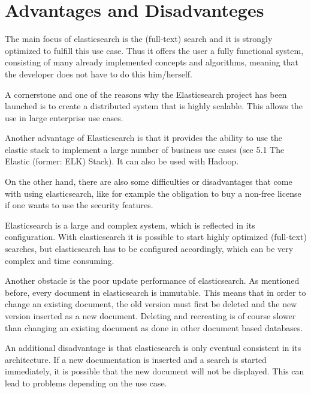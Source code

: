 \chapter{Advantages and Disadvanteges}

The main focus of elasticsearch is the (full-text) search and it is strongly optimized to fulfill this use case. Thus it offers the user a fully functional system, consisting of many already implemented concepts and algorithms, meaning that the developer does not have to do this him/herself.

A cornerstone and one of the reasons why the Elasticsearch project has been launched is to create a distributed system that is highly scalable. This allows the use in large enterprise use cases.

Another advantage of Elasticsearch is that it provides the ability to use the elastic stack to implement a large number of business use cases (see 5.1 The Elastic (former: ELK) Stack). It can also be used with Hadoop.


On the other hand, there are also some difficulties or disadvantages that come with using elasticsearch, like for example the obligation to buy a non-free license if one wants to use the security features.

Elasticsearch is a large and complex system, which is reflected in its configuration. With elasticsearch it is possible to start highly optimized (full-text) searches, but elasticsearch has to be configured accordingly, which can be very complex and time consuming. 

Another obstacle is the poor update performance of elasticsearch. As mentioned before, every document in elasticsearch is immutable. This means that in order to change an existing document, the old version must first be deleted and the new version inserted as a new document. Deleting and recreating is of course slower than changing an existing document as done in other document based databases.

An additional disadvantage is that elasticsearch is only eventual consistent in its architecture. If a new documentation is inserted and a search is started immediately, it is possible that the new document will not be displayed. This can lead to problems depending on the use case.
